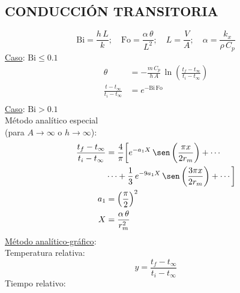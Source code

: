 \documentclass[letter,oneside,10pt]{article}
\begin{document}
\begin{multicols}{3}
\scriptsize
\section*{CONDUCCIÓN TRANSITORIA}
\begin{equation*}
    \text{Bi} = \frac{h\,L}{k};\quad
    \text{Fo} = \frac{\alpha\,\theta}{L^2};\quad
    L = \frac{V}{A};\quad
    \alpha = \frac{k_x}{\rho\,C_p}
\end{equation*}
\underline{Caso}: $\text{Bi}\leq 0.1$
\begin{equation*}
    \begin{split}
        \theta &= -\frac{m\,C_p}{h\,A}\,\ln
                  \left(\frac{t_f-t_{\infty}}{t_i-t_{\infty}}\right)\\
        \frac{t-t_{\infty}}{t_i-t_{\infty}} &= e^{-\text{Bi}\,\text{Fo}}\\
    \end{split}
\end{equation*}
\underline{Caso}: $\text{Bi}>0.1$\\
Método analítico especial\\
(para $A\rightarrow\infty$ o $h\rightarrow\infty$):
\begin{equation*}
    \begin{split}
        \frac{t_f-t_\infty}{t_i-t_\infty}
            & = \frac{4}{\pi}\biggr[e^{-{a_1}X}\,
            \sen\left(\frac{\pi{x}}{2{r_m}}\right)+\cdots\\
            & \cdots+\frac{1}{3}\,e^{-9{a_1}X}\,
            \sen\left(\frac{3\pi{x}}{2{r_m}}\right)+
            \cdots\biggr]\\
        a_1 &= \left(\frac{\pi}{2}\right)^2\\
        X &= \frac{\alpha\,\theta}{r_m^2}\\
    \end{split}
\end{equation*}
\underline{Método analítico-gráfico}:\\
Temperatura relativa:
\vspace{-0.3cm}
\begin{equation*}
    y = \frac{t_f-t_\infty}{t_i-t_\infty}
\end{equation*}
Tiempo relativo:
\vspace{-0.5cm}

\end{multicols}
\end{document}
